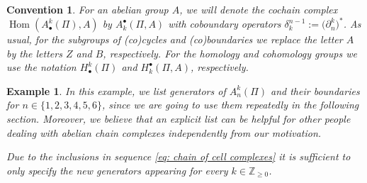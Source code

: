 \documentclass[pdftex]{sigma}
\numberwithin{equation}{section}
\newtheorem{Example}[Theorem]{Example}
\newtheorem{conve}[Theorem]{Convention}
\newcommand{\ZZ }{\mathbb{Z}}
\DeclareMathOperator{\Hom}{Hom}
\begin{document}
\begin{conve}
 For an abelian group $A$, we will denote the cochain complex $\Hom(A^k_\bullet(\Pi),A)$ by $A_k^\bullet(\Pi,A)$ with coboundary operators $\delta_k^{n-1}:=\big(\partial_n^k\big)^*$. As usual, for the subgroups of (co)cycles and (co)boundaries we replace the letter $A$ by the letters $Z$ and $B$, respectively. For the homology and cohomology groups we use the notation $H^k_\bullet(\Pi)$ and $H_k^\bullet(\Pi,A)$, respectively.
\end{conve}

\begin{Example}\allowdisplaybreaks
In this example, we list generators of $A^k_n(\Pi)$ and their boundaries for $n \in \{1,2,3,4,5,6\}$, since we are going to use them repeatedly in the following section. Moreover, we believe that an explicit list can be helpful for other people dealing with abelian chain complexes independently from our motivation.

Due to the inclusions in sequence \eqref{eq: chain of cell complexes} it is sufficient to only specify the new generators appearing for every $k \in \ZZ_{\geq 0}$.


\end{Example}
\end{document}
